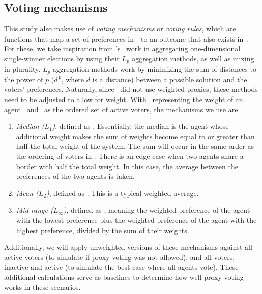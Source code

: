 \subsection{Voting mechanisms}\label{subsec:voting-mechanisms}
This study also makes use of \textit{voting mechanisms} or \textit{voting rules},
which are functions that map a set of preferences in~\systemspace\ to an outcome that
also exists in~\systemspace.
For these, we take inspiration from 's~\cite{Bulteau2021} work in
aggregating one-dimensional single-winner elections by using their $L_p$ aggregation
methods, as well as mixing in plurality.
$L_p$ aggregation methods work by minimizing the sum of distances to the power of $p$
($d^{\,p}$, where $d$ is a distance) between a possible solution and the voters'
preferences.
Naturally, since~\cite{Bulteau2021} did not use weighted proxies, these methods need
to be adjusted to allow for weight.
With \agentweight\ representing the weight of an agent \agent\ and \systemproxies\ as
the ordered set of active voters, the mechanisms we use are
\begin{enumerate}
    \item {
        \textit{Median ($L_1$)}, defined as
        $$.
           Essentially, the median is the agent whose additional weight makes the sum of
        weights become equal to or greater than half the total weight of the system.
        The sum will occur in the same order as the ordering of voters in
        \systemproxies.
        There is an edge case when two agents share a border with half the total weight.
        In this case, the average between the preferences of the two agents is taken.
    }
    \item {
        \textit{Mean ($L_2$)}, defined as
        $$.
        This is a typical weighted average.
    }
    \item {
        \textit{Mid-range ($L_\infty$)}, defined as
        $$, meaning the weighted
        preference of the agent with the lowest preference plus the weighted
        preference of the agent with the highest preference, divided by the sum of
        their weights.
    }
\end{enumerate}
Additionally, we will apply unweighted versions of these mechanisms against all active  
voters (to simulate if proxy voting was not allowed), and all voters, inactive and
active (to simulate the best case where all agents vote).
These additional calculations serve as baselines to determine how well proxy voting
works in these scenarios.

